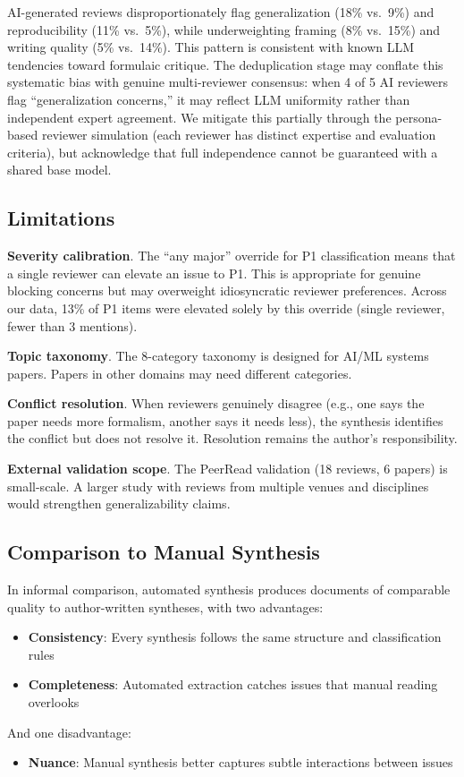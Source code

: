 AI-generated reviews disproportionately flag generalization (18\% vs.\ 9\%) and reproducibility (11\% vs.\ 5\%), while underweighting framing (8\% vs.\ 15\%) and writing quality (5\% vs.\ 14\%). This pattern is consistent with known LLM tendencies toward formulaic critique. The deduplication stage may conflate this systematic bias with genuine multi-reviewer consensus: when 4 of 5 AI reviewers flag ``generalization concerns,'' it may reflect LLM uniformity rather than independent expert agreement. We mitigate this partially through the persona-based reviewer simulation (each reviewer has distinct expertise and evaluation criteria), but acknowledge that full independence cannot be guaranteed with a shared base model.

\subsection{Limitations}

\textbf{Severity calibration}. The ``any major'' override for P1 classification means that a single reviewer can elevate an issue to P1. This is appropriate for genuine blocking concerns but may overweight idiosyncratic reviewer preferences. Across our data, 13\% of P1 items were elevated solely by this override (single reviewer, fewer than 3 mentions).

\textbf{Topic taxonomy}. The 8-category taxonomy is designed for AI/ML systems papers. Papers in other domains may need different categories.

\textbf{Conflict resolution}. When reviewers genuinely disagree (e.g., one says the paper needs more formalism, another says it needs less), the synthesis identifies the conflict but does not resolve it. Resolution remains the author's responsibility.

\textbf{External validation scope}. The PeerRead validation (18 reviews, 6 papers) is small-scale. A larger study with reviews from multiple venues and disciplines would strengthen generalizability claims.

\subsection{Comparison to Manual Synthesis}

In informal comparison, automated synthesis produces documents of comparable quality to author-written syntheses, with two advantages:
\begin{itemize}
    \item \textbf{Consistency}: Every synthesis follows the same structure and classification rules
    \item \textbf{Completeness}: Automated extraction catches issues that manual reading overlooks
\end{itemize}

And one disadvantage:
\begin{itemize}
    \item \textbf{Nuance}: Manual synthesis better captures subtle interactions between issues
\end{itemize}
